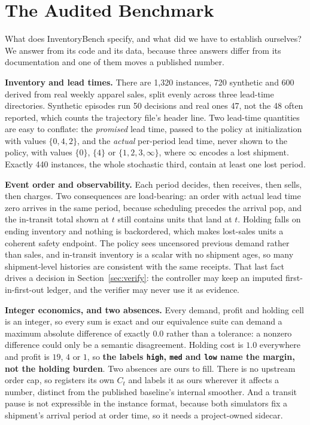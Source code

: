 \section{The Audited Benchmark}
\label{sec:background}

What does InventoryBench specify, and what did we have to establish ourselves? We
answer from its code and its data, because three answers differ from its
documentation and one of them moves a published number.

\textbf{Inventory and lead times.} There are 1{,}320 instances, 720 synthetic and
600 derived from real weekly apparel sales, split evenly across three lead-time
directories. Synthetic episodes run 50 decisions and real ones 47, not the 48
often reported, which counts the trajectory file's header line. Two lead-time
quantities are easy to conflate: the \emph{promised} lead time, passed to the
policy at initialization with values $\{0, 4, 2\}$, and the \emph{actual}
per-period lead time, never shown to the policy, with values $\{0\}$, $\{4\}$ or
$\{1,2,3,\infty\}$, where $\infty$ encodes a lost shipment. Exactly 440 instances,
the whole stochastic third, contain at least one lost period.

\textbf{Event order and observability.} Each period decides, then receives, then
sells, then charges. Two consequences are load-bearing: an order with actual lead
time zero arrives in the same period, because scheduling precedes the arrival
pop, and the in-transit total shown at $t$ still contains units that land at $t$.
Holding falls on ending inventory and nothing is backordered, which makes
lost-sales units a coherent safety endpoint. The policy sees uncensored previous
demand rather than sales, and in-transit inventory is a scalar with no shipment
ages, so many shipment-level histories are consistent with the same receipts.
That last fact drives a decision in Section~\ref{sec:verify}: the controller may
keep an imputed first-in-first-out ledger, and the verifier may never use it as
evidence.

\textbf{Integer economics, and two absences.} Every demand, profit and holding
cell is an integer, so every sum is exact and our equivalence suite can demand a
maximum absolute difference of exactly $0.0$ rather than a tolerance: a nonzero
difference could only be a semantic disagreement. Holding cost is $1.0$ everywhere
and profit is $19$, $4$ or $1$, so \textbf{the labels \texttt{high},
\texttt{med} and \texttt{low} name the margin, not the holding burden}. Two
absences are ours to fill. There is no upstream order cap, so \collie{} registers
its own $C_t$ and labels it as ours wherever it affects a number, distinct from
the published baseline's internal smoother. And a transit pause is not
expressible in the instance format, because both simulators fix a shipment's
arrival period at order time, so it needs a project-owned sidecar.

